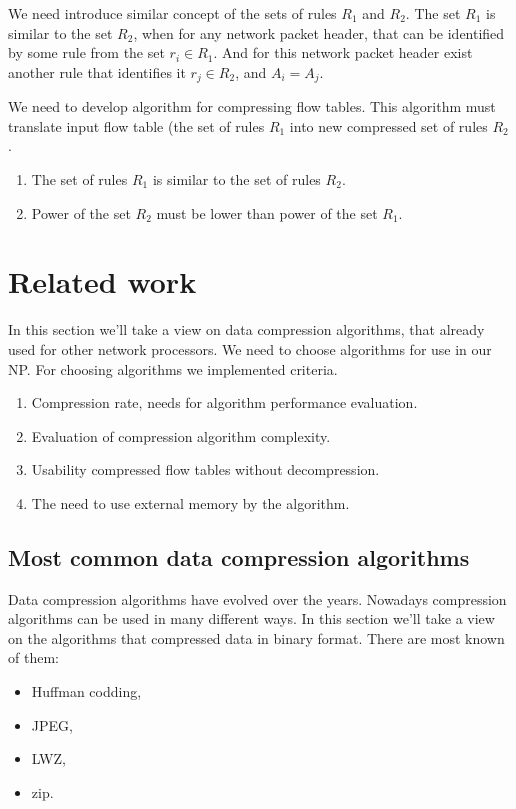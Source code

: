 \documentclass[conference]{IEEEtran}
\begin{document}
        We need introduce similar concept of the sets of rules \(R_1\) and \(R_2\).
        The set \(R_1\) is similar to the set \(R_2\), when for any network packet header, 
        that can be identified by some rule from the set \(r_i \in R_1\).
        And for this network packet header exist another rule that identifies it \(r_j \in R_2\), and \(A_i = A_j\).

        We need to develop algorithm for compressing flow tables. This algorithm must translate input flow table (the set of rules \(R_1\)
        into new compressed set of rules \(R_2\). 
        \begin{enumerate}
            \item The set of rules \(R_1\) is similar to the set of rules \(R_2\).
            \item Power of the set \(R_2\) must be lower than power of the set \(R_1\).
        \end{enumerate}

    \section{Related work}
        In this section we'll take a view on data compression algorithms, that already used
        for other network processors. We need to choose algorithms for use in our NP.
        For choosing algorithms we implemented criteria.
        \begin{enumerate}
            \item Compression rate, needs for algorithm performance evaluation.
            \item Evaluation of compression algorithm complexity.
            \item Usability compressed flow tables without decompression.
            \item The need to use external memory by the algorithm.
        \end{enumerate}

        \subsection{Most common data compression algorithms}
            Data compression algorithms have evolved over the years. Nowadays compression 
            algorithms can be used in many different ways. In this section we'll take a view
            on the algorithms that compressed data in binary format.
            There are most known of them:
            \begin{itemize}
                \item Huffman codding,
                \item JPEG,
                \item LWZ,
                \item zip.
            \end{itemize}
  
\end{document}
